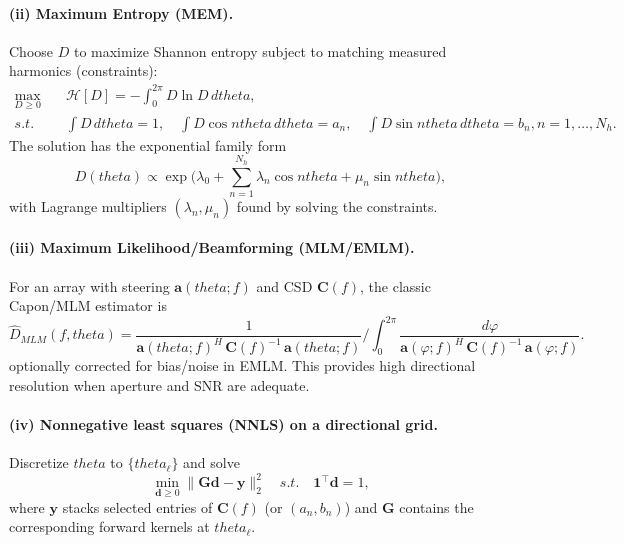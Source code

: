 \documentclass[journal,10pt,twocolumn]{IEEEtran}
\def\theta{theta}%
\def\mathrm#1{#1}%
\def\text#1{#1}%
\def\;{ }%
\begin{document}
    \paragraph{(ii) Maximum Entropy (MEM).}
    Choose $D$ to maximize Shannon entropy subject to matching measured harmonics (constraints):
    \begin{align}
        \max_{D\ge0}\quad & \mathcal{H}[D] = -\int_{0}^{2\pi} D\ln D\, d\theta,\\
        \text{s.t.}\quad & \int D\,d\theta=1,\quad
        \int D \cos n\theta\, d\theta = a_n,\quad
        \int D \sin n\theta\, d\theta = b_n,\; n=1,\ldots,N_h.
    \end{align}
    The solution has the exponential family form
    \begin{equation}
        D(\theta)\propto
        \exp\Big(\lambda_0 + \sum_{n=1}^{N_h}\lambda_n\cos n\theta + \mu_n\sin n\theta\Big),
    \end{equation}
    with Lagrange multipliers $(\lambda_n,\mu_n)$ found by solving the constraints.

    \paragraph{(iii) Maximum Likelihood/Beamforming (MLM/EMLM).}
    For an array with steering $\mathbf{a}(\theta;f)$ and CSD $\mathbf{C}(f)$, the classic Capon/MLM estimator is
    \begin{equation}
        \widehat{D}_{\text{MLM}}(f,\theta)
        = \frac{1}{\mathbf{a}(\theta;f)^{\mathrm{H}}\,
        \mathbf{C}(f)^{-1}\,\mathbf{a}(\theta;f)}\;\bigg/ \;
        \int_{0}^{2\pi}\frac{d\varphi}{\mathbf{a}(\varphi;f)^{\mathrm{H}}\,
        \mathbf{C}(f)^{-1}\,\mathbf{a}(\varphi;f)}.
    \end{equation}
    optionally corrected for bias/noise in EMLM. This provides high directional resolution when aperture and SNR are adequate.

    \paragraph{(iv) Nonnegative least squares (NNLS) on a directional grid.}
    Discretize $\theta$ to $\{\theta_\ell\}$ and solve
    \begin{equation}
        \min_{\mathbf{d}\ge0}\;\big\|\mathbf{G}\mathbf{d}-\mathbf{y}\big\|_2^2
        \quad \text{s.t.}\quad \mathbf{1}^\top\mathbf{d}=1,
    \end{equation}
    where $\mathbf{y}$ stacks selected entries of $\mathbf{C}(f)$ (or $(a_n,b_n)$) and $\mathbf{G}$ contains the corresponding forward kernels at $\theta_\ell$.
\end{document}
